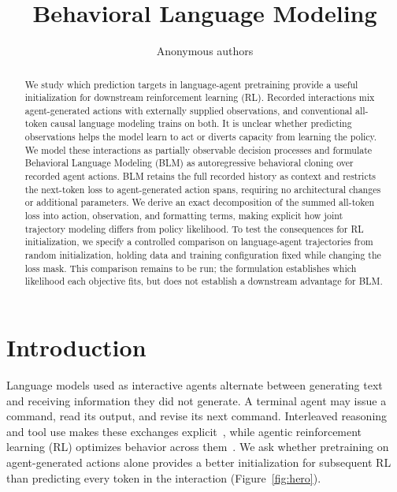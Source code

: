 \documentclass{article} %
\title{Behavioral Language Modeling}
\author{Anonymous authors}
\begin{document}
\ifcolmsubmission
\linenumbers
\fi
\maketitle

\begin{abstract}
We study which prediction targets in language-agent pretraining provide a useful initialization for downstream reinforcement learning (RL).
Recorded interactions mix agent-generated actions with externally supplied observations, and conventional all-token causal language modeling trains on both.
It is unclear whether predicting observations helps the model learn to act or diverts capacity from learning the policy.
We model these interactions as partially observable decision processes and formulate Behavioral Language Modeling (BLM) as autoregressive behavioral cloning over recorded agent actions.
BLM retains the full recorded history as context and restricts the next-token loss to agent-generated action spans, requiring no architectural changes or additional parameters.
We derive an exact decomposition of the summed all-token loss into action, observation, and formatting terms, making explicit how joint trajectory modeling differs from policy likelihood.
To test the consequences for RL initialization, we specify a controlled comparison on language-agent trajectories from random initialization, holding data and training configuration fixed while changing the loss mask.
This comparison remains to be run; the formulation establishes which likelihood each objective fits, but does not establish a downstream advantage for BLM.
\end{abstract}



\section{Introduction}
Language models used as interactive agents alternate between generating text and receiving information they did not generate. A terminal agent may issue a command, read its output, and revise its next command. Interleaved reasoning and tool use makes these exchanges explicit~\citep{yao2023react}, while agentic reinforcement learning (RL) optimizes behavior across them~\citep{cheng2025agentr1}. We ask whether pretraining on agent-generated actions alone provides a better initialization for subsequent RL than predicting every token in the interaction (Figure~\ref{fig:hero}).
\end{document}
